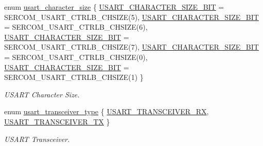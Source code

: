 \begin{DoxyCompactItemize}
$$enum \mbox{\hyperlink{group__asfdoc__sam0__sercom__usart__group_ga631ce7b4f60dccd392e6d6ef7d3cd4e2}{usart\+\_\+character\+\_\+size}} \{ \newline
\mbox{\hyperlink{group__asfdoc__sam0__sercom__usart__group_gga631ce7b4f60dccd392e6d6ef7d3cd4e2ab1db6dc41b52d70a9185b963d9140c7f}{U\+S\+A\+R\+T\+\_\+\+C\+H\+A\+R\+A\+C\+T\+E\+R\+\_\+\+S\+I\+Z\+E\+\_\+B\+IT}} = S\+E\+R\+C\+O\+M\+\_\+\+U\+S\+A\+R\+T\+\_\+\+C\+T\+R\+L\+B\+\_\+\+C\+H\+S\+I\+ZE(5), 
\mbox{\hyperlink{group__asfdoc__sam0__sercom__usart__group_gga631ce7b4f60dccd392e6d6ef7d3cd4e2a4b631e89e72f2b939afbc4a996d358b9}{U\+S\+A\+R\+T\+\_\+\+C\+H\+A\+R\+A\+C\+T\+E\+R\+\_\+\+S\+I\+Z\+E\+\_\+B\+IT}} = S\+E\+R\+C\+O\+M\+\_\+\+U\+S\+A\+R\+T\+\_\+\+C\+T\+R\+L\+B\+\_\+\+C\+H\+S\+I\+ZE(6), 
\mbox{\hyperlink{group__asfdoc__sam0__sercom__usart__group_gga631ce7b4f60dccd392e6d6ef7d3cd4e2ab5e1a6e76a61ee79563a551ad2431726}{U\+S\+A\+R\+T\+\_\+\+C\+H\+A\+R\+A\+C\+T\+E\+R\+\_\+\+S\+I\+Z\+E\+\_\+B\+IT}} = S\+E\+R\+C\+O\+M\+\_\+\+U\+S\+A\+R\+T\+\_\+\+C\+T\+R\+L\+B\+\_\+\+C\+H\+S\+I\+ZE(7), 
\mbox{\hyperlink{group__asfdoc__sam0__sercom__usart__group_gga631ce7b4f60dccd392e6d6ef7d3cd4e2a8679bfe526e0d92b5d313f9f5880da4b}{U\+S\+A\+R\+T\+\_\+\+C\+H\+A\+R\+A\+C\+T\+E\+R\+\_\+\+S\+I\+Z\+E\+\_\+B\+IT}} = S\+E\+R\+C\+O\+M\+\_\+\+U\+S\+A\+R\+T\+\_\+\+C\+T\+R\+L\+B\+\_\+\+C\+H\+S\+I\+ZE(0), 
\newline
\mbox{\hyperlink{group__asfdoc__sam0__sercom__usart__group_gga631ce7b4f60dccd392e6d6ef7d3cd4e2a6a7fe30ecca9dbde62c154d6619cab7f}{U\+S\+A\+R\+T\+\_\+\+C\+H\+A\+R\+A\+C\+T\+E\+R\+\_\+\+S\+I\+Z\+E\+\_\+B\+IT}} = S\+E\+R\+C\+O\+M\+\_\+\+U\+S\+A\+R\+T\+\_\+\+C\+T\+R\+L\+B\+\_\+\+C\+H\+S\+I\+ZE(1)
 \}
\begin{DoxyCompactList}\small\item\em U\+S\+A\+RT Character Size. \end{DoxyCompactList}\item 
enum \mbox{\hyperlink{group__asfdoc__sam0__sercom__usart__group_gaab1b986bc581f76e99eec14ac37efe05}{usart\+\_\+transceiver\+\_\+type}} \{ \mbox{\hyperlink{group__asfdoc__sam0__sercom__usart__group_ggaab1b986bc581f76e99eec14ac37efe05a627832963965f11ae53299b802582c48}{U\+S\+A\+R\+T\+\_\+\+T\+R\+A\+N\+S\+C\+E\+I\+V\+E\+R\+\_\+\+RX}}, 
\mbox{\hyperlink{group__asfdoc__sam0__sercom__usart__group_ggaab1b986bc581f76e99eec14ac37efe05a9d1050c223a28be7aefcbca46a0add81}{U\+S\+A\+R\+T\+\_\+\+T\+R\+A\+N\+S\+C\+E\+I\+V\+E\+R\+\_\+\+TX}}
 \}
\begin{DoxyCompactList}\small\item\em U\+S\+A\+RT Transceiver. \end{DoxyCompactList}\end{DoxyCompactItemize}
